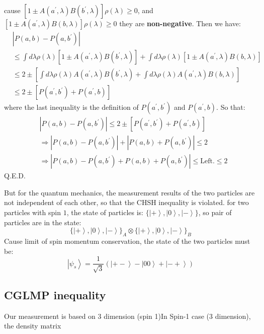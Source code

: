 \documentclass{article}
\newcommand{\ket}[1]{\left|#1\right\rangle}
\begin{document}
cause \([1\pm A(a^\prime,\lambda)B(b^\prime,\lambda)]\rho(\lambda) \geqslant 0 \), and \([1\pm A(a^\prime,\lambda)B(b,\lambda)]\rho(\lambda) \geqslant 0 \) they are \textbf{non-negative}.  Then we have:
\begin{align*}
    &|P(a,b)-P(a,b^\prime)|\\
    &\leqslant \int d\lambda \rho(\lambda) [1\pm A(a^\prime,\lambda)B(b^\prime,\lambda)]+\int d\lambda \rho(\lambda) [1\pm A(a^\prime,\lambda)B(b,\lambda)]\\
    &\leqslant 2 \pm \left[\int d\lambda \rho(\lambda) A(a^\prime,\lambda)B(b^\prime,\lambda) + \int d\lambda \rho(\lambda) A(a^\prime,\lambda)B(b,\lambda)\right]\\
    &\leqslant 2 \pm \left[P(a^\prime,b^\prime)+P(a^\prime,b)\right]
\end{align*}
where the last inequality is the definition of \(P(a^\prime,b^\prime)\) and \(P(a^\prime,b)\). So that:
\begin{align*}
    &|P(a,b)-P(a,b^\prime)|\leqslant 2 \pm \left[P(a^\prime,b^\prime)+P(a^\prime,b)\right]\\
    &\Rightarrow |P(a,b)-P(a,b^\prime)|+|P(a,b)+P(a,b^\prime)|\leqslant 2\\
    &\Rightarrow |P(a,b)-P(a,b^\prime)+P(a,b)+P(a,b^\prime)|\leqslant \text{Left.} \leqslant 2
\end{align*}
Q.E.D. 

But for the quantum mechanics, the measurement results of the two particles are not independent of each other, so that the CHSH inequality is violated. for two particles with spin \(1\), the state of particles is: \(\{\ket{+},\ket{0},\ket{-}\}\), so pair of particles are in the state:
\[\{\ket{+},\ket{0},\ket{-}\}_A\otimes\{\ket{+},\ket{0},\ket{-}\}_B\]
Cause limit of spin momentum conservation, the state of the two particles must be:
\[\ket{\psi_{s}}=\frac{1}{\sqrt{3}}(\ket{+-}-\ket{00}+\ket{-+})\]


\subsection{CGLMP inequality}
Our measurement is based on 3 dimension (spin 1)In Spin-1 case (3 dimension), the density matrix
\end{document}
